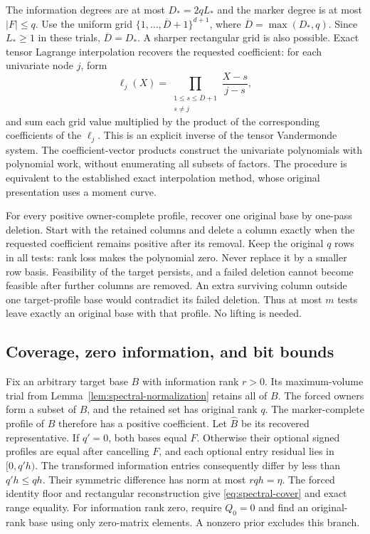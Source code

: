 The information degrees are at most $D_*=2qL_*$ and the marker degree is
at most $|F|\le q$. Use the uniform grid
$\{1,\ldots,\overline D+1\}^{d+1}$, where
$\overline D=\max(D_*,q)$. Since $L_*\ge1$ in these trials,
$\overline D=D_*$. A sharper rectangular grid is also possible.
Exact tensor Lagrange interpolation recovers the requested coefficient:
for each univariate node $j$, form
\[
 \ell_j(X)=\prod_{\substack{1\le s\le\overline D+1\\s\ne j}}
                   \frac{X-s}{j-s},
\]
and sum each grid value multiplied by the product of the corresponding
coefficients of the $\ell_j$. This is an explicit inverse of the tensor
Vandermonde system. The coefficient-vector products construct the
univariate polynomials with polynomial work, without enumerating all
subsets of factors. The procedure is equivalent to the established exact
interpolation method, whose original presentation uses a moment curve.

For every positive owner-complete profile, recover one original base by
one-pass deletion. Start with the retained columns and delete a column
exactly when the requested coefficient remains positive after its removal.
Keep the original $q$ rows in all tests: rank loss makes the polynomial
zero. Never replace it by a smaller row basis. Feasibility of the target
persists, and a failed deletion cannot become feasible after further
columns are removed. An extra surviving column outside one target-profile
base would contradict its failed deletion. Thus at most $m$ tests leave
exactly an original base with that profile. No lifting is needed.

\subsection{Coverage, zero information, and bit bounds}
Fix an arbitrary target base $B$ with information rank $r>0$. Its
maximum-volume trial from Lemma~\ref{lem:spectral-normalization} retains
all of $B$. The forced owners form a subset of $B$, and the retained set
has original rank $q$. The marker-complete profile of $B$ therefore has a
positive coefficient. Let $\widehat B$ be its recovered representative.
If $q'=0$, both bases equal $F$. Otherwise their optional signed profiles
are equal after cancelling $F$, and each optional entry residual lies in
$[0,q'h)$. The transformed information entries consequently differ by
less than $q'h\le qh$. Their symmetric difference has norm at most
$rqh=\eta$. The forced identity floor and rectangular reconstruction give
\eqref{eq:spectral-cover} and exact range equality. For information rank
zero, require $Q_0=0$ and find an original-rank base using only zero-matrix
elements. A nonzero prior excludes this branch.


